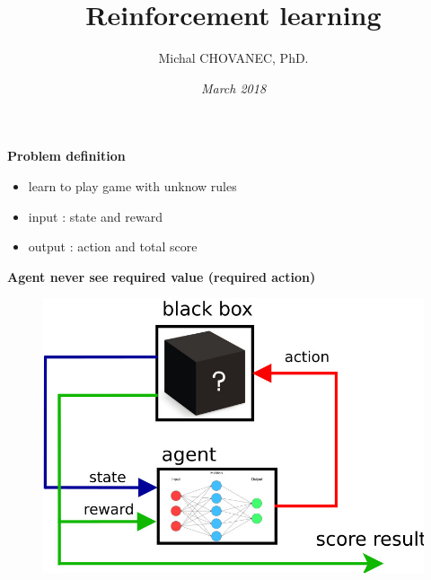 \documentclass[xcolor=dvipsnames]{beamer}
\title{\bf Reinforcement learning}
\author{Michal CHOVANEC, PhD.}
\date[EURP]{\it March 2018}
\begin{document}
\begin{frame}
\titlepage
{}
\end{frame}


\begin{frame}{\bf Problem definition}
\begin{itemize}
 \item learn to play game with unknow rules
 \item input  : state and reward
 \item output : action and total score
\end{itemize}
\centering

{\bf Agent never see required value (required action)}


\begin{figure}
\centering
\begin{minipage}{.5\textwidth}
  \centering
  \includegraphics[scale=0.2]{../../diagrams/rl_mechanism.jpg}
\end{minipage}%
\begin{minipage}{.5\textwidth}
  \centering

\end{minipage}
\end{figure}
\end{frame}
\end{document}
